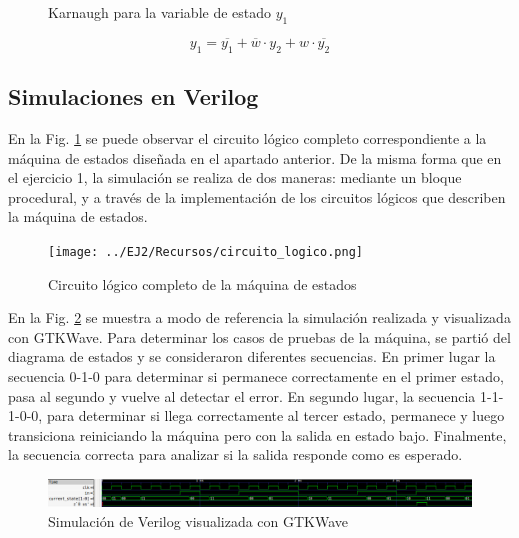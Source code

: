 \begin{figure}[H]
    \centering
    \begin{Karnaughvuit}
    \end{Karnaughvuit}
    \caption{Karnaugh para la variable de estado $y_1$}
\end{figure}

\begin{equation}
    y_1 = \overline{y_1} + \overline{w} \cdot y_2 + w \cdot \overline{y_2}
\end{equation}

\subsection{Simulaciones en Verilog}
En la Fig. \ref{fig:circuito_logico_ej2} se puede observar el circuito l\'ogico completo correspondiente a la m\'aquina de estados dise\~nada
en el apartado anterior. De la misma forma que en el ejercicio 1, la simulación se realiza de dos maneras: mediante un bloque procedural, y a través de la implementación 
de los circuitos lógicos que describen la máquina de estados.

\begin{figure}[H]
    \centering
    \texttt{[image: ../EJ2/Recursos/circuito\_logico.png]}
    \caption{Circuito l\'ogico completo de la m\'aquina de estados}
    \label{fig:circuito_logico_ej2}
\end{figure}

En la Fig. \ref{fig:ej2_simulacion} se muestra a modo de referencia la simulaci\'on realizada y visualizada con GTKWave. Para determinar los casos de pruebas de la m\'aquina,
se parti\'o del diagrama de estados y se consideraron diferentes secuencias. En primer lugar la secuencia 0-1-0 para determinar si permanece correctamente en el primer estado,
pasa al segundo y vuelve al detectar el error. En segundo lugar, la secuencia 1-1-1-0-0, para determinar si llega correctamente al tercer estado, permanece y luego transiciona reiniciando
la m\'aquina pero con la salida en estado bajo. Finalmente, la secuencia correcta para analizar si la salida responde como es esperado.

\begin{figure}[H]
    \centering
    \includegraphics[scale=0.4]{../EJ2/Recursos/simulacion.png}    
    \caption{Simulaci\'on de Verilog visualizada con GTKWave}
    \label{fig:ej2_simulacion}
\end{figure}

